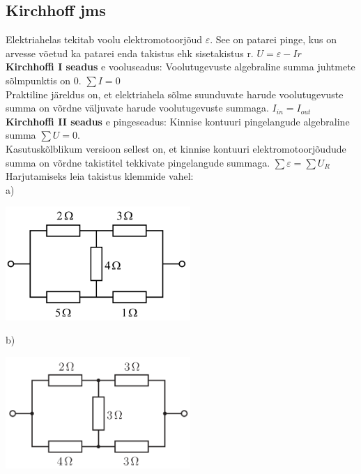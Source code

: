 \documentclass{article}
\begin{document}
\subsection*{Kirchhoff jms}
Elektriahelas tekitab voolu elektromotoorjõud $\varepsilon$. See on patarei pinge, kus on arvesse võetud ka patarei enda takistus ehk sisetakistus r. $U = \varepsilon - Ir$\\
\textbf{Kirchhoffi I seadus} e vooluseadus: 
Voolutugevuste algebraline summa juhtmete sõlmpunktis on 0.  $\sum I = 0$\\
Praktiline järeldus on, et elektriahela sõlme suunduvate harude voolutugevuste summa on võrdne väljuvate harude voolutugevuste summaga. $I_{in} = I_{out}$\\
\textbf{Kirchhoffi II seadus} e pingeseadus: Kinnise kontuuri pingelangude algebraline summa $\sum U = 0$. \\
Kasutuskõlblikum versioon sellest on, et kinnise kontuuri elektromotoorjõudude summa on võrdne takistitel tekkivate pingelangude summaga. $\sum \varepsilon = \sum U_R$\\
Harjutamiseks leia takistus klemmide vahel:\\
a)\\
\begin{center}
\includegraphics[width =  7cm]{ec3.PNG}
\end{center}
b)\\
\begin{center}
\includegraphics[width =  7cm]{ec4.PNG}
\end{center}
\end{document}
